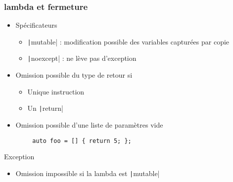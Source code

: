 \documentclass[C++.tex]{subfiles}
\begin{document}
\begin{frame}[fragile]
	\frametitle{lambda et fermeture}
	\begin{itemize}
		\item Spécificateurs
		\begin{itemize}
			\item \texttt|mutable| : modification possible des variables capturées par copie
			\item \texttt|noexcept| : ne lève pas d'exception
		\end{itemize}

		\item Omission possible du type de retour si
		\begin{itemize}
			\item Unique instruction
			\item Un \texttt|return|
		\end{itemize}


		\item Omission possible d'une liste de paramètres vide
	\end{itemize}

	\begin{verbatim}
		auto foo = [] { return 5; };
	\end{verbatim}

	\begin{alertblock}{Exception}
		\begin{itemize}
			\item Omission impossible si la lambda est \texttt|mutable|
		\end{itemize}
	\end{alertblock}


\end{frame}
\end{document}
